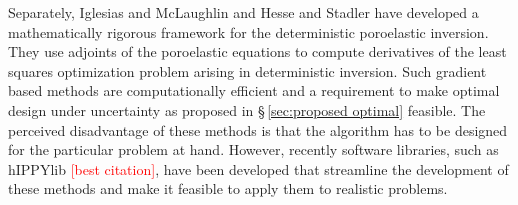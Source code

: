 \documentclass[11pt,final]{article}%
\newcommand{\note}[1]{\textcolor{red}{ #1}}
\begin{document}
Separately, Iglesias and McLaughlin \cite{Iglesias2012a} and Hesse and Stadler \cite{Hesse2014} have developed a mathematically rigorous framework for the deterministic poroelastic inversion. They use adjoints of the poroelastic equations to compute derivatives of the least squares optimization problem arising in deterministic inversion. Such gradient based methods are computationally efficient and a requirement to make optimal design under uncertainty as proposed in \S\,\ref{sec:proposed optimal} feasible. The perceived disadvantage of these methods is that the algorithm has to be designed for the particular problem at hand. However, recently software libraries, such as hIPPYlib \note{[best citation]}, have been developed that streamline the development of these methods and make it feasible to apply them to realistic problems.
\end{document}
